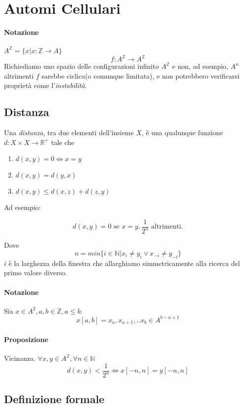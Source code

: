 \documentclass[12pt]{article}
\begin{document}
\maketitle

\section{Automi Cellulari}

\paragraph{Notazione} $A^\mathds{Z} = \{ x | x: \mathds{Z} \rightarrow A\}$
$$ f: A^\mathds{Z} \rightarrow A^\mathds{Z} $$
Richiediamo uno spazio delle configurazioni infinito $A^\mathds{Z}$ e non, ad esempio, $A^n$ altrimenti $f$ sarebbe ciclica(o comunque limitata), e non potrebbero verificarsi proprietà come l'\textit{instabilità}.
\subsection{Distanza}
Una \textit{distanza}, tra due elementi dell'insieme $X$, è una qualunque funzione $d: X \times X \rightarrow \mathds{R}^{+}$ tale che

\begin{enumerate}
	\item $d(x,y) = 0 \Leftrightarrow x = y$
	\item $d(x,y) = d(y,x) $
	\item $d(x,y) \leq d(x,z) + d(z,y)$
\end{enumerate}

Ad esempio:

$$d(x,y) = 0 \text{ se } x = y, \frac{1}{2^n} \text{ altrimenti.}$$

Dove
$$n = min\{ i \in \mathds{N} | x_i \neq y_i \vee x_{-i} \neq y_{-i} \} $$ $i$ è la larghezza della finestra che allarghiamo simmetricamente alla ricerca del primo valore diverso.

\paragraph{Notazione} Sia $x \in A^2, a,b \in \mathds{Z}, a \leq b$:
$$x[a,b] = x_a, x_{a+1}, .. x_{b} \in A^{b-a+1}
$$

\paragraph{Proposizione} Vicinanza. $\forall x,y \in A^\mathds{Z}, \forall n \in \mathds{N}$
$$d(x,y) < \frac{1}{2^n} \iff x[-n,n] = y[-n,n]$$


\subsection{Definizione formale}
\end{document}

